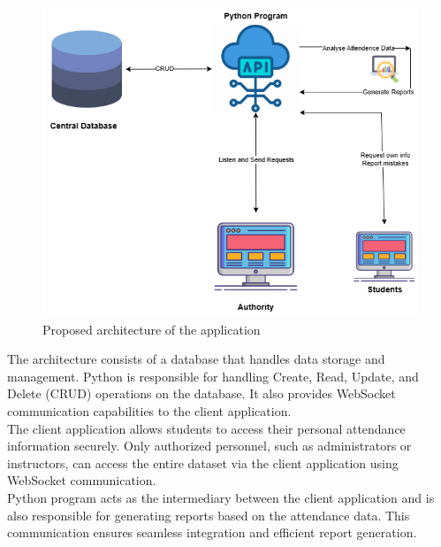 \begin{figure}[H]
    \includegraphics[width=\linewidth]{figures/architecture.png}
    \centering
    \caption{Proposed architecture of the application}
    \label{fig:arch}
\end{figure}

The architecture consists of a database that handles data storage and management. Python is responsible for handling Create, Read, Update, and Delete (CRUD) operations on the database. It also provides WebSocket communication capabilities to the client application.\\

The client application allows students to access their personal attendance information securely. Only authorized personnel, such as administrators or instructors, can access the entire dataset via the client application using WebSocket communication.\\

Python program acts as the intermediary between the client application and is also responsible for generating reports based on the attendance data. This communication ensures seamless integration and efficient report generation.\\

